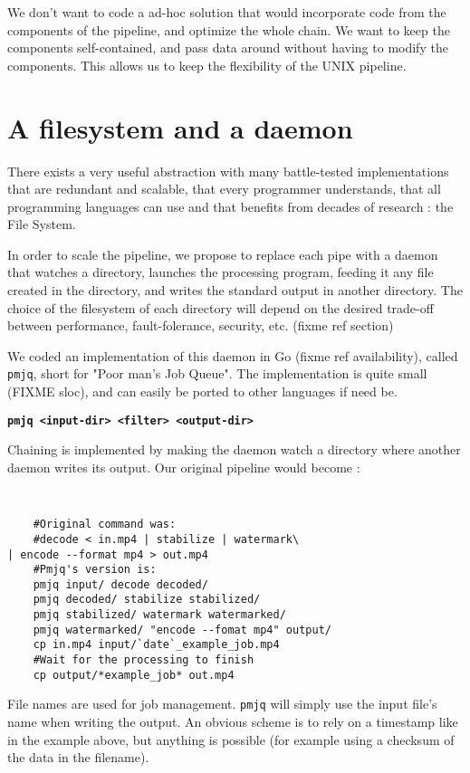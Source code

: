 \documentclass[letterpaper,twocolumn,10pt]{article}
\begin{document}
We don't want to code a ad-hoc solution that would incorporate code from the components of the pipeline, and optimize the whole chain. We want to keep the components self-contained, and pass data around without having to modify the components. This allows us to keep the flexibility of the UNIX pipeline.

\section{A filesystem and a daemon}
\label{sec:fsd}

There exists a very useful abstraction with many battle-tested implementations that are redundant and scalable, that every programmer understands, that all programming languages can use and that benefits from decades of research : the File System.

In order to scale the pipeline, we propose to replace each pipe with a daemon that watches a directory, launches the processing program, feeding it any file created in the directory, and writes the standard output in another directory. The choice of the filesystem of each directory will depend on the desired trade-off between performance, fault-folerance, security, etc. (fixme ref section)

We coded an implementation of this daemon in Go (fixme ref availability), called {\tt pmjq}, short for "Poor man's Job Queue". The implementation is quite small (FIXME sloc), and can easily be ported to other languages if need be.

    {\bf \tt pmjq <input-dir> <filter> <output-dir> \\}

Chaining is implemented by making the daemon watch a directory where another daemon writes its output. Our original pipeline would become :
{\tt \small
\begin{verbatim}
    #Original command was: 
    #decode < in.mp4 | stabilize | watermark\
| encode --format mp4 > out.mp4
    #Pmjq's version is:
    pmjq input/ decode decoded/
    pmjq decoded/ stabilize stabilized/
    pmjq stabilized/ watermark watermarked/
    pmjq watermarked/ "encode --fomat mp4" output/ 
    cp in.mp4 input/`date`_example_job.mp4
    #Wait for the processing to finish
    cp output/*example_job* out.mp4
\end{verbatim}
}

File names are used for job management. {\tt pmjq} will simply use the input file's name when writing the output. An obvious scheme is to rely on a timestamp like in the example above, but anything is possible (for example using a checksum of the data in the filename).
\end{document}
